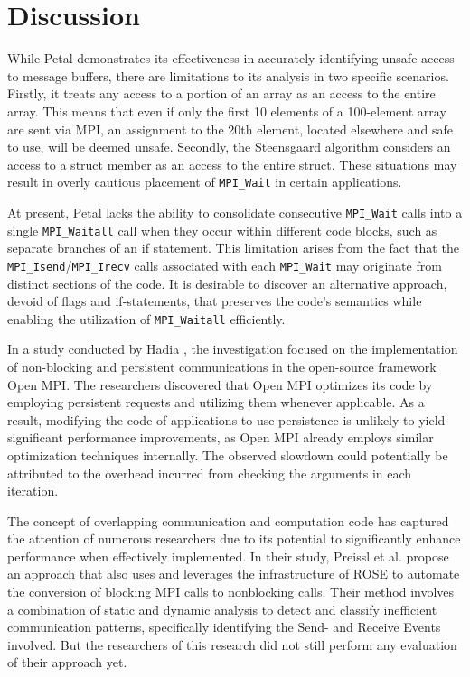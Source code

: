 \section{Discussion}
While Petal demonstrates its effectiveness in accurately identifying unsafe access to message buffers, there are limitations to its analysis in two specific scenarios. 
Firstly, it treats any access to a portion of an array as an access to the entire array. 
This means that even if only the first 10 elements of a 100-element array are sent via MPI, an assignment to the 20th element, located elsewhere and safe to use, will be deemed unsafe. 
Secondly, the Steensgaard algorithm \cite{steensgaard_points-analysis_1996} considers an access to a struct member as an access to the entire struct. 
These situations may result in overly cautious placement of \texttt{MPI\_Wait} in certain applications. 

At present, Petal lacks the ability to consolidate consecutive \texttt{MPI\_Wait} calls into a single \texttt{MPI\_Waitall} call when they occur within different code blocks, such as separate branches of an if statement. 
This limitation arises from the fact that the \texttt{MPI\_Isend}/\texttt{MPI\_Irecv} calls associated with each \texttt{MPI\_Wait} may originate from distinct sections of the code. 
It is desirable to discover an alternative approach, devoid of flags and if-statements, that preserves the code's semantics while enabling the utilization of \texttt{MPI\_Waitall} efficiently.

In a study conducted by Hadia \cite{ahmed_petal_2016}, the investigation focused on the implementation of non-blocking and persistent communications in the open-source framework Open MPI. The researchers discovered that Open MPI optimizes its code by employing persistent requests and utilizing them whenever applicable. 
As a result, modifying the code of applications to use persistence is unlikely to yield significant performance improvements, as Open MPI already employs similar optimization techniques internally. 
The observed slowdown could potentially be attributed to the overhead incurred from checking the arguments in each iteration.

The concept of overlapping communication and computation code has captured the attention of numerous researchers due to its potential to significantly enhance performance when effectively implemented.
In their study, Preissl et al. \cite{preissl_using_2008} propose an approach that also uses and leverages the infrastructure of ROSE to automate the conversion of blocking MPI calls to nonblocking calls. Their method involves a combination of static and dynamic analysis to detect and classify inefficient communication patterns, specifically identifying the Send- and Receive Events involved. But the researchers of this research did not still perform any evaluation of their approach yet.

